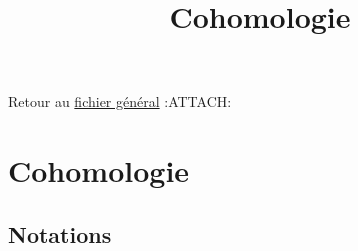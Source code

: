 \documentclass[12pt,makeidx]{amsart}
\title{Cohomologie}
\author{}
\date{}
\begin{document}
\maketitle

\setcounter{tocdepth}{3}
\tableofcontents
\vspace*{1cm}

Retour au \href{file:///home/basile/Git/Geometrie Complexe/Programme.org}{fichier général}                                          :ATTACH:

\section{Cohomologie}
\label{sec-1}
\subsection{Notations}
\label{sec-1-1}
\end{document}
